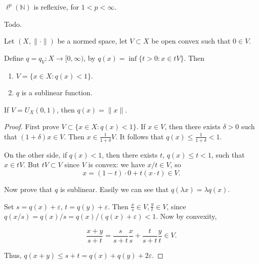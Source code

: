 \begin{theorem}
	\label{thm:LpSpacesAreReflexive}
	 $\ell^p(\mathbb{N})$ is reflexive, for  $1 < p < \infty $.
\end{theorem}
Todo.

\begin{lemma}
	\label{lem:Minkowski}
	Let $(X, \|\cdot \|)$ be a normed space, let $V \subset X$ be open convex such that $0 \in V$. 

	Define $q = q_V: X \to  [0,\infty )$, by $q(x) = \inf \{t > 0: x \in  tV\} $. Then
	\begin{enumerate}
		\item $V = \{x \in X: q(x) < 1\} $.
		\item $q$ is a sublinear function.
	\end{enumerate}
	
\end{lemma}
\begin{remark}
	If $V = U_X(0,1)$, then $q(x) = \|x\|$.
\end{remark}
\begin{proof}
	First prove $V \subset  \{x \in X: q(x) < 1\} $. If $x \in V$, then there exists $\delta > 0$ such that $( 1 + \delta) x \in V$. Then $x \in \frac{1}{1 + \delta}V$. It follows that $q(x) \le \frac{1}{1 + \delta} < 1$.

	On the other side, if $q(x) < 1$, then there exists $t$, $q(x) \le t < 1$, such that $x \in t V$. But $t V \subset V$ since $V$ is convex: we have $x / t \in V$, so
	\[
		x = (1 - t) \cdot 0 + t \left( x \cdot t \right)  \in V
	.\] 

	Now prove that $q$ is sublinear. 
	Easily we can see that $q(\lambda x) = \lambda q(x)$.

	Set $s = q(x) + \varepsilon$, $t = q(y) + \varepsilon$. Then $\frac{x}{s} \in V, \frac{y}{t} \in V$, since $q(x / s) = q(x) / s = q(x) / (q(x) + \varepsilon) < 1$. Now by convexity,

	\[
		\frac{x + y}{ s + t} = \frac{s}{s + t} \frac{x}{s} + \frac{t}{s + t} \frac{y}{t} \in V
	.\] 

	Thus, $q(x + y) \le  s + t = q(x) + q(y) + 2 \varepsilon$.

\end{proof}

